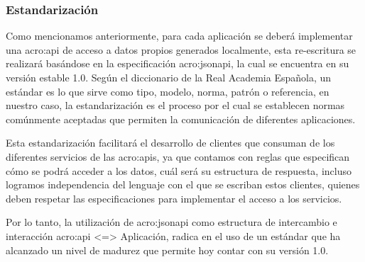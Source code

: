 \subsubsection{Estandarización}

Como mencionamos anteriormente, para cada aplicación se deberá implementar una \gls{acro:api} de acceso a datos propios generados localmente, esta re-escritura se realizará basándose en la especificación \gls{acro:jsonapi}, la cual se encuentra en su versión estable 1.0.
Según el diccionario de la Real Academia Española,  un estándar es lo que sirve como tipo, modelo, norma, patrón o referencia, en nuestro caso, la estandarización es el proceso por el cual se establecen normas comúnmente aceptadas que permiten la comunicación de diferentes aplicaciones.

Esta estandarización facilitará el desarrollo de clientes que consuman de los diferentes servicios de las \glspl{acro:api}, ya que contamos con reglas que especifican cómo se podrá acceder a los datos, cuál será su estructura de respuesta, incluso logramos independencia del lenguaje con el que se escriban estos clientes, quienes deben respetar las especificaciones para implementar el acceso a los servicios.

Por lo tanto, la utilización de \gls{acro:jsonapi} como estructura de intercambio e interacción \gls{acro:api} <=> Aplicación, radica en el uso de un estándar que ha alcanzado un nivel de madurez que permite hoy contar con su versión 1.0.
